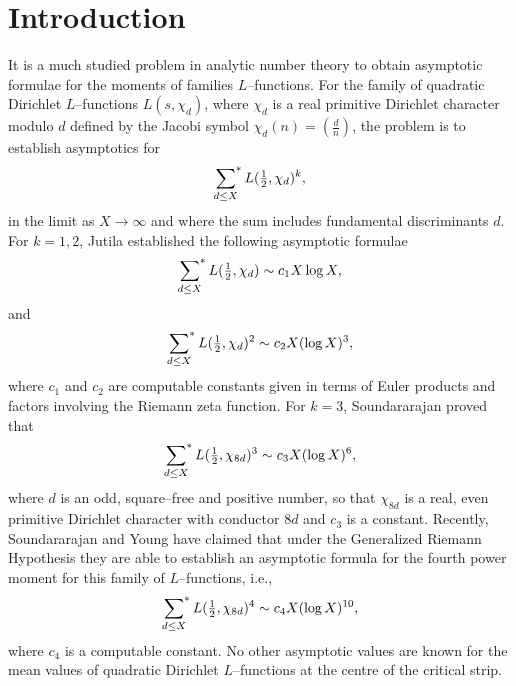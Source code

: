 \documentclass[11pt]{amsart}
\begin{document}
\maketitle

\section{Introduction}

It is a much studied problem in analytic number theory to obtain asymptotic formulae for the moments of families $L$--functions. For the family of quadratic Dirichlet $L$--functions $L(s,\chi_{d})$, where $\chi_{d}$ is a real primitive Dirichlet character modulo $d$ defined by the Jacobi symbol $\chi_{d}(n)=\left(\frac{d}{n}\right)$, the problem is to establish asymptotics for
\begin{equation}
\label{1.1}
\sideset{}{^{*}}\sum_{d\leq X}L(\tfrac{1}{2},\chi_{d})^{k},
\end{equation}
in the limit as $X\rightarrow\infty$ and where the sum includes fundamental discriminants $d$. For $k=1,2$, Jutila \cite{J} established the following asymptotic formulae
\begin{equation}
\sideset{}{^{*}}\sum_{d\leq X}L(\tfrac{1}{2},\chi_{d})\sim c_{1}X\log X,
\end{equation} 
and
\begin{equation}
\sideset{}{^{*}}\sum_{d\leq X}L(\tfrac{1}{2},\chi_{d})^{2}\sim c_{2}X(\log X)^{3},
\end{equation}
where $c_{1}$ and $c_{2}$ are computable constants given in terms of Euler products and factors involving the Riemann zeta function. For $k=3$, Soundararajan \cite{S} proved that
\begin{equation}
\sideset{}{^{*}}\sum_{d\leq X}L(\tfrac{1}{2},\chi_{8d})^{3}\sim c_{3}X(\log X)^{6},
\end{equation}
where $d$ is an odd, square--free and positive number, so that $\chi_{8d}$ is a real, even primitive Dirichlet character with conductor $8d$ and $c_{3}$ is a constant. Recently, Soundararajan and Young \cite{S-Y} have claimed that under the Generalized Riemann Hypothesis they are able to establish an asymptotic formula for the fourth power moment for this family of $L$--functions, i.e.,
\begin{equation}
\sideset{}{^{*}}\sum_{d\leq X}L(\tfrac{1}{2},\chi_{8d})^{4}\sim c_{4}X(\log X)^{10},
\end{equation}
where $c_{4}$ is a computable constant. No other asymptotic values are known for the mean values of quadratic Dirichlet $L$--functions at the centre of the critical strip.
\end{document}
